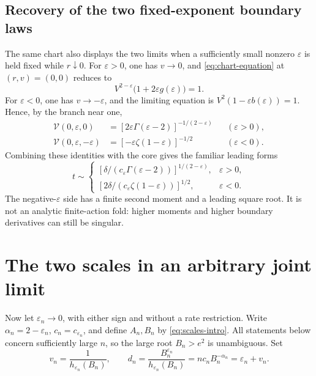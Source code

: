 \documentclass[11pt,a4paper]{article}
\numberwithin{equation}{section}
\theoremstyle{definition}
\theoremstyle{remark}
\newcommand{\eps}{\varepsilon}
\newcommand{\cV}{\mathcal V}
\begin{document}
\subsection{Recovery of the two fixed-exponent boundary laws}
The same chart also displays the two limits when a sufficiently small nonzero
\(\eps\) is held fixed while \(r\downarrow0\). For \(\eps>0\), one has
\(v\to0\), and \eqref{eq:chart-equation} at \((r,v)=(0,0)\) reduces to
\[
 V^{2-\eps}\bigl(1+2\eps g(\eps)\bigr)=1.
\]
For \(\eps<0\), one has \(v\to-\eps\), and the limiting equation is
\(V^2(1-\eps b(\eps))=1\). Hence, by the branch near one,
\begin{align}
 \cV(0,\eps,0)&=[2\eps\Gamma(\eps-2)]^{-1/(2-\eps)}
       &&(\eps>0), \label{eq:stable-chart-limit}\\
 \cV(0,\eps,-\eps)&=[-\eps\zeta(1-\eps)]^{-1/2}
       &&(\eps<0). \label{eq:gauss-chart-limit}
\end{align}
Combining these identities with the core gives the familiar leading forms
\begin{equation}
 t\sim
 \begin{cases}
 [\delta/(c_\eps\Gamma(\eps-2))]^{1/(2-\eps)},&\eps>0,\\[2pt]
 [2\delta/(c_\eps\zeta(1-\eps))]^{1/2},&\eps<0.
 \end{cases}
 \label{eq:fixed-exponents}
\end{equation}
The negative-\(\eps\) side has a finite second moment and a leading square
root. It is not an analytic finite-action fold: higher moments and higher
boundary derivatives can still be singular.

\section{The two scales in an arbitrary joint limit}
\label{sec:scales}
Now let \(\eps_n\to0\), with either sign and without a rate restriction. Write
\(\alpha_n=2-\eps_n\), \(c_n=c_{\eps_n}\), and define \(A_n,B_n\) by
\eqref{eq:scales-intro}. All statements below concern sufficiently large
\(n\), so the large root \(B_n>e^2\) is unambiguous. Set
\begin{equation}
 v_n=\frac1{h_{\eps_n}(B_n)},\qquad
 d_n=\frac{B_n^{\eps_n}}{h_{\eps_n}(B_n)}
     =nc_nB_n^{-\alpha_n}=\eps_n+v_n.
 \label{eq:dn}
\end{equation}
\end{document}
